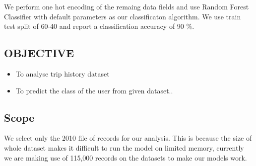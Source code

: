 \documentclass[a4paper, 12pt]{article}
\begin{document}
We perform one hot encoding of the remaing data fields and use Random Forest Classifier with default parameters as our classificaton algorithm. We use train test split of 60-40  and report a classification accuracy of 90 \%.



\newpage
\begin{center}
\section{OBJECTIVE}
\end{center}
\begin{itemize}
    \item To analyse trip history dataset
    \item To predict the class of the user from given dataset..
\end{itemize}


\newpage
\begin{center}
\section{Scope}
\end{center}

We select only the 2010 file of records for our analysis. This is because the size of whole dataset makes it difficult to run the model on limited memory, currently we are making use of 115,000 records on the datasets to make our  models work.
\end{document}
